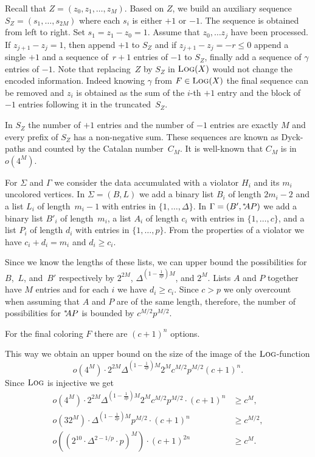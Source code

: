 Recall that $Z=(z_0,z_1,\ldots,z_M)$.  Based on $Z$, we build an
auxiliary sequence $S_Z = (s_1,\ldots,s_{2M})$ where each $s_i$ is
either $+1$ or $-1$.  The sequence is obtained from left to right. Set
$s_1=z_1-z_0=1$.  Assume that $z_0,\ldots z_j$ have been processed. If
$z_{j+1}-z_j=1$, then append $+1$ to $S_Z$ and if
$z_{j+1}-z_j=-r \leq 0$ append a single $+1$ and a sequence of~$r+1$
entries of $-1$ to $S_Z$, finally add a sequence of $\gamma$ entries of
$-1$. Note that replacing~$Z$ by $S_Z$ in $\text{\scshape Log}(X)$ would not change
the encoded information. Indeed knowing $\gamma$ from $F\in\text{\scshape Log}(X)$ the
final sequence can be removed and $z_i$ is obtained as the sum of the
$i$-th $+1$ entry and the block of $-1$ entries following it in the
truncated~$S_Z$.

In $S_Z$ the number of $+1$ entries and the number of $-1$
entries are exactly $M$ and
every prefix of $S_Z$ has a non-negative sum.  These
sequences are known as Dyck-paths and counted
by the Catalan number~$C_M$. It is well-known that 
$C_M$ is in $o(4^{M})$.

For $\Sigma$ and $\Gamma$ we consider the data accumulated
with a violator $H_i$ and its $m_i$ uncolored vertices.
In $\Sigma=(B,L)$ we add a binary list $B_i$ of length $2m_i-2$
and a list $L_i$ of length~$m_i-1$ with entries in $\{1,\ldots,\Delta\}$.
In $\Gamma=(B',{}^{*}\kern-3pt AP)$ we add a binary list $B'_i$ of length~$m_i$,
a list $A_i$ of length $c_i$ with entries in $\{1,\ldots,c\}$,
and a list $P_i$ of length $d_i$ with entries in
$\{1,\ldots,p\}$. From the properties of a violator we have
$c_i+d_i=m_i$ and $d_i\geq c_i$.

Since we know the lengths of these lists, we can upper bound the
possibilities for~$B$,~$L$, and~$B'$ respectively by $2^{2M}$,
$\Delta^{\left(1-\frac{1}{2p}\right)M}$, and $2^M$. Lists $A$ and $P$
together have $M$ entries and for each $i$ we have $d_i\geq
c_i$. Since $c > p$ we only overcount when assuming that $A$ and $P$
are of the same length, therefore, the number of possibilities for
${}^{*}\kern-3pt AP$ is bounded by $c^{M/2}p^{M/2}$.

For the final coloring $F$ there are $(c+1)^n$ options.

This way we obtain an upper bound on the size of the image of the $\text{\scshape Log}$-function 
$$o(4^{M}) \cdot 2^{2M} \Delta^{\left(1-\frac{1}{2p}\right)M} 2^M c^{M/2}p^{M/2}(c+1)^n.$$
Since $\text{\scshape Log}$ is injective we get
\begin{align*}
o(4^{M}) \cdot 2^{2M} \Delta^{\left(1-\frac{1}{2p}\right)M} 2^M c^{M/2}p^{M/2}\cdot(c+1)^n &\geq c^M,\\
o(32^{M})\cdot \Delta^{\left(1-\frac{1}{2p}\right)M} p^{M/2}\cdot (c+1)^n &\geq c^{M/2},\\
o\left(\left(2^{10}\cdot\Delta^{2-1/p}\cdot p\right)^M\right)\cdot (c+1)^{2n} &\geq c^M.
\end{align*}

